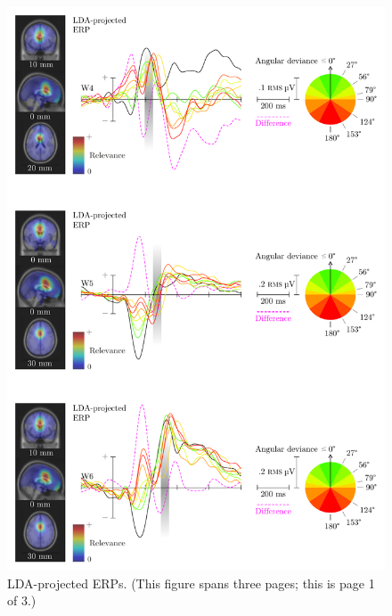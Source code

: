 \begin{figure}[p]
    \renewcommand\thefigure{\ref{chapter:nat}.S5.2}
    \centering
    \includegraphics[width=\textwidth]{figures/nat-app-fig-s5-2.pdf}
    \caption{LDA-projected ERPs. (This figure spans three pages; this is page 1 of 3.)}
\end{figure}

